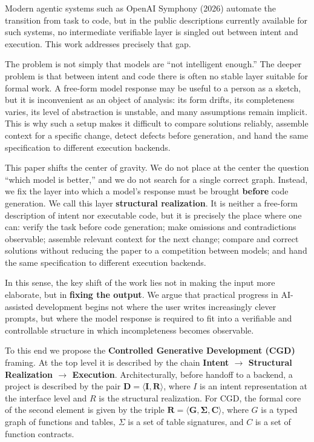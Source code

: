 \documentclass[12pt,a4paper]{article}
\begin{document}
Modern agentic systems such as OpenAI Symphony (2026) \cite{openai2026symphony} automate the transition from task to code, but in the public descriptions currently available for such systems, no intermediate verifiable layer is singled out between intent and execution. This work addresses precisely that gap.

The problem is not simply that models are ``not intelligent enough.'' The deeper problem is that between intent and code there is often no stable layer suitable for formal work. A free-form model response may be useful to a person as a sketch, but it is inconvenient as an object of analysis: its form drifts, its completeness varies, its level of abstraction is unstable, and many assumptions remain implicit. This is why such a setup makes it difficult to compare solutions reliably, assemble context for a specific change, detect defects before generation, and hand the same specification to different execution backends.

This paper shifts the center of gravity. We do not place at the center the question ``which model is better,'' and we do not search for a single correct graph. Instead, we fix the layer into which a model's response must be brought \textbf{before} code generation. We call this layer \textbf{structural realization}. It is neither a free-form description of intent nor executable code, but it is precisely the place where one can: verify the task before code generation; make omissions and contradictions observable; assemble relevant context for the next change; compare and correct solutions without reducing the paper to a competition between models; and hand the same specification to different execution backends.

In this sense, the key shift of the work lies not in making the input more elaborate, but in \textbf{fixing the output}. We argue that practical progress in AI-assisted development begins not where the user writes increasingly clever prompts, but where the model response is required to fit into a verifiable and controllable structure in which incompleteness becomes observable.

To this end we propose the \textbf{Controlled Generative Development (CGD)} framing. At the top level it is described by the chain \textbf{Intent $\to$ Structural Realization $\to$ Execution}. Architecturally, before handoff to a backend, a project is described by the pair $\mathbf{D = \langle I, R \rangle}$, where $I$ is an intent representation at the interface level and $R$ is the structural realization. For CGD, the formal core of the second element is given by the triple $\mathbf{R = \langle G, \Sigma, C \rangle}$, where $G$ is a typed graph of functions and tables, $\Sigma$ is a set of table signatures, and $C$ is a set of function contracts.
\end{document}
